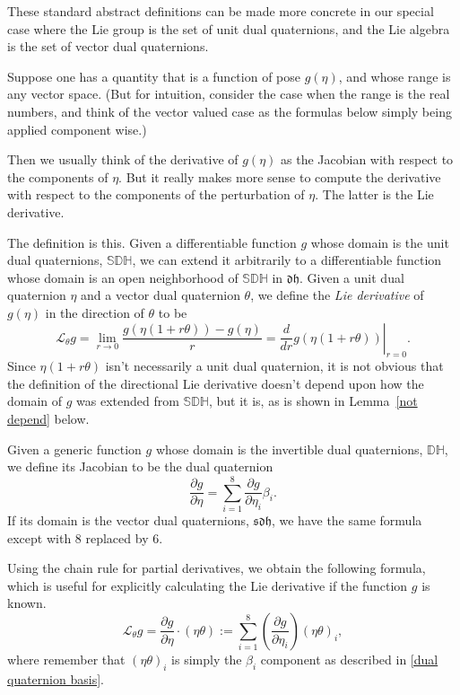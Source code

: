\documentclass[reqno,12pt]{amsart}
\newcommand\setinvertibledualquat{\mathbb D\mathbb H}
\newcommand\setdualquat{\mathfrak d \mathfrak h}
\newcommand\setunitdualquat{\mathbb S\mathbb D\mathbb H}
\newcommand\setvectordualquat{\mathfrak{s}\mathfrak d \mathfrak h}
\newcommand{\liederiv}{\mathcal L}
\begin{document}
These standard abstract definitions can be made more concrete in our special case where the Lie group is the set of unit dual quaternions, and the Lie algebra is the set of vector dual quaternions.

Suppose one has a quantity that is a function of pose $g(\eta)$, and whose range is any vector space.  (But for intuition, consider the case when the range is the real numbers, and think of the vector valued case as the formulas below simply being applied component wise.)

Then we usually think of the derivative of $g(\eta)$ as the Jacobian with respect to the components of $\eta$.  But it really makes more sense to compute the derivative with respect to the components of the perturbation of $\eta$.  The latter is the Lie derivative.

The definition is this.  Given a differentiable function $g$ whose domain is the unit dual quaternions, $\setunitdualquat$, we can extend it arbitrarily to a differentiable function whose domain is an open neighborhood of $\setunitdualquat$ in $\setdualquat$.  Given a unit dual quaternion $\eta$ and a vector dual quaternion $\theta$, we define the \emph{Lie derivative} of $g(\eta)$ in the direction of $\theta$ to be
\begin{equation}
\label{lie diff defn}
\liederiv_\theta g = 
\lim_{r\to 0} \frac{g(\eta(1+r \theta)) - g(\eta)} r = 
\left. \frac{d}{d r} g(\eta(1+r\theta)) \right |_{r = 0}.
\end{equation}
Since $\eta(1+r\theta)$ isn't necessarily a unit dual quaternion, it is not obvious that the definition of the directional Lie derivative doesn't depend upon how the domain of $g$ was extended from $\setunitdualquat$, but it is, as is shown in Lemma~\ref{not depend} below.

Given a generic function $g$ whose domain is the invertible dual quaternions, $\setinvertibledualquat$, we define its Jacobian to be the dual quaternion
\begin{equation}
\frac{\partial g}{\partial \eta} = \sum_{i=1}^8 \frac{\partial g}{\partial \eta_i} \beta_i.
\end{equation}
If its domain is the vector dual quaternions, $\setvectordualquat$, we have the same formula except with $8$ replaced by $6$.

Using the chain rule for partial derivatives, we obtain the following formula, which is useful for explicitly calculating the Lie derivative if the function $g$ is known.
\begin{equation}
\label{lie diff defn 2}
\liederiv_\theta g = \frac{\partial g}{\partial \eta} \cdot (\eta \theta) := \sum_{i=1}^8 \left(\frac{\partial g}{\partial \eta_i}\right) (\eta \theta)_i ,
\end{equation}
where remember that $(\eta\theta)_i$ is simply the $\beta_i$ component as described in \eqref{dual quaternion basis}.
\end{document}
